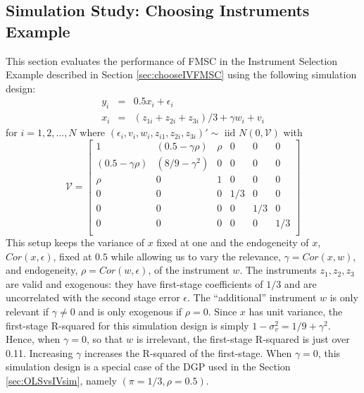 \subsection{Simulation Study: Choosing Instruments Example}\label{sec:fmscsim}
This section evaluates the performance of FMSC in the Instrument Selection Example described in Section \ref{sec:chooseIVFMSC} using the following simulation design:
\begin{eqnarray}
		\label{eq:secondstage}
		y_i &=& 0.5 x_i + \epsilon_i\\ 
		x_i &=& (z_{1i} + z_{2i} + z_{3i}) /3 + \gamma w_i + v_i 
		\label{eq:firststage}
	\end{eqnarray}
for $i=1, 2, \hdots, N$ where $(\epsilon_i, v_i, w_i, z_{i1}, z_{2i}, z_{3i})' \sim \mbox{ iid  } N(0,\mathcal{V})$ with	
\begin{equation}
			\label{eq:varmatrix}
			\mathcal{V} = \left[  
				\begin{array}{cccccc}
				1 & (0.5 - \gamma \rho) & \rho & 0 & 0 & 0\\
				(0.5 - \gamma \rho) & (8/9 - \gamma^2) & 0 & 0 & 0 & 0 \\
				\rho & 0 & 1 & 0 & 0 & 0\\
				0 & 0 & 0 & 1/3 & 0 & 0\\
				0 & 0 & 0 & 0 & 1/3 & 0\\
				0 & 0 & 0 & 0 & 0 & 1/3\\
				\end{array}
		\right]
\end{equation}
This setup keeps the variance of $x$ fixed at one and the endogeneity of $x$, $Cor(x, \epsilon)$, fixed at $0.5$ while allowing us to vary the relevance, $\gamma = Cor(x,w)$, and endogeneity, $\rho = Cor(w, \epsilon)$, of the instrument $w$.
The instruments $z_1, z_2, z_3$ are valid and exogenous: they have first-stage coefficients of $1/3$ and are uncorrelated with the second stage error $\epsilon$.
The ``additional'' instrument $w$ is only relevant if $\gamma \neq 0$ and is only exogenous if $\rho = 0$.
Since $x$ has unit variance, the first-stage R-squared for this simulation design is simply $1 - \sigma_v^2 = 1/9 + \gamma^2$.
Hence, when  $\gamma = 0$, so that $w$ is irrelevant, the first-stage R-squared is just over 0.11.
Increasing $\gamma$ increases the R-squared of the first-stage.
When $\gamma = 0$, this simulation design is a special case of the DGP used in the Section \ref{sec:OLSvsIVsim}, namely $(\pi=1/3, \rho = 0.5)$.
